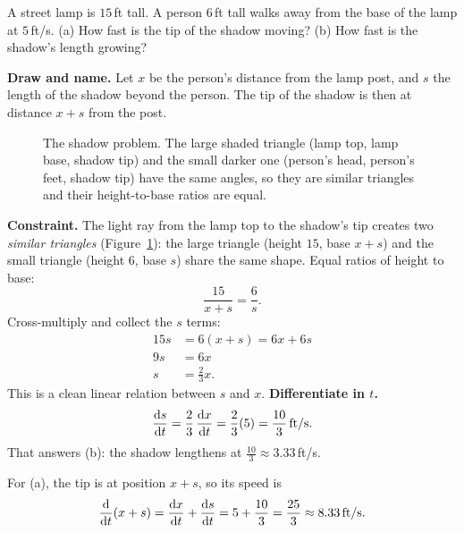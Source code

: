 \begin{example}
\label{ch13:ex-shadow}
A street lamp is $15$\,ft tall. A person $6$\,ft tall walks away from the base of the lamp at
$5$\,ft/s. (a) How fast is the tip of the shadow moving? (b) How fast is the shadow's length growing?

\textbf{Draw and name.} Let $x$ be the person's distance from the lamp post, and $s$ the length of
the shadow beyond the person. The tip of the shadow is then at distance $x+s$ from the post.

\begin{figure}[H]
\centering
{}
\caption{The shadow problem. The large shaded triangle (lamp top, lamp base, shadow tip) and the small
darker one (person's head, person's feet, shadow tip) have the same angles, so they are similar
triangles and their height-to-base ratios are equal.}
\label{ch13:fig-shadow}
\end{figure}

\textbf{Constraint.} The light ray from the lamp top to the shadow's tip creates two \emph{similar
triangles} (Figure~\ref{ch13:fig-shadow}): the
large triangle (height $15$, base $x+s$) and the small triangle (height $6$, base $s$) share the same
shape. Equal ratios of height to base:
\[
\frac{15}{x+s} = \frac{6}{s}.
\]
Cross-multiply and collect the $s$ terms:
\begin{align*}
15 s &= 6(x+s) = 6x + 6s \\
9s &= 6x \\
s &= \frac{2}{3}x.
\end{align*}
This is a clean linear relation between $s$ and $x$.
\textbf{Differentiate in $t$.}
\[
\frac{\mathrm{d} s}{\mathrm{d} t} = \frac{2}{3}\,\frac{\mathrm{d} x}{\mathrm{d} t} = \frac{2}{3}(5) = \frac{10}{3}\,\text{ft/s}.
\]
That answers (b): the shadow lengthens at $\tfrac{10}{3}\approx 3.33$\,ft/s.

For (a), the tip is at position $x+s$, so its speed is
\[
\frac{\mathrm{d} }{\mathrm{d} t}(x+s) = \frac{\mathrm{d} x}{\mathrm{d} t} + \frac{\mathrm{d} s}{\mathrm{d} t} = 5 + \frac{10}{3} = \frac{25}{3}\approx 8.33\,\text{ft/s}.
\]
\end{example}

